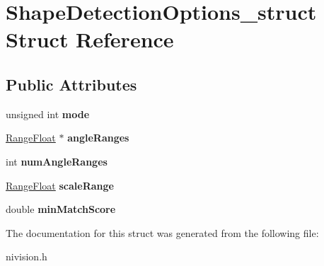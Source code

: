 \hypertarget{structShapeDetectionOptions__struct}{\section{\-Shape\-Detection\-Options\-\_\-struct \-Struct \-Reference}
\label{structShapeDetectionOptions__struct}
}
\subsection*{\-Public \-Attributes}
\begin{DoxyCompactItemize}
\item 
\hypertarget{structShapeDetectionOptions__struct_aa32480ba15b493a07fcc6381eff8ff87}{unsigned int {\bfseries mode}}\label{structShapeDetectionOptions__struct_aa32480ba15b493a07fcc6381eff8ff87}

\item 
\hypertarget{structShapeDetectionOptions__struct_af637cad25271750dc012e9044e594c71}{\hyperlink{structRangeFloat__struct}{\-Range\-Float} $\ast$ {\bfseries angle\-Ranges}}\label{structShapeDetectionOptions__struct_af637cad25271750dc012e9044e594c71}

\item 
\hypertarget{structShapeDetectionOptions__struct_a0277b59b645822eeaf4764ad06121357}{int {\bfseries num\-Angle\-Ranges}}\label{structShapeDetectionOptions__struct_a0277b59b645822eeaf4764ad06121357}

\item 
\hypertarget{structShapeDetectionOptions__struct_a70f678f8bbdca3cd350efe117cc52b6b}{\hyperlink{structRangeFloat__struct}{\-Range\-Float} {\bfseries scale\-Range}}\label{structShapeDetectionOptions__struct_a70f678f8bbdca3cd350efe117cc52b6b}

\item 
\hypertarget{structShapeDetectionOptions__struct_a7b8d94aba889f9fe2a96b6b1ae805b56}{double {\bfseries min\-Match\-Score}}\label{structShapeDetectionOptions__struct_a7b8d94aba889f9fe2a96b6b1ae805b56}

\end{DoxyCompactItemize}


\-The documentation for this struct was generated from the following file\-:\begin{DoxyCompactItemize}
\item 
nivision.\-h\end{DoxyCompactItemize}
